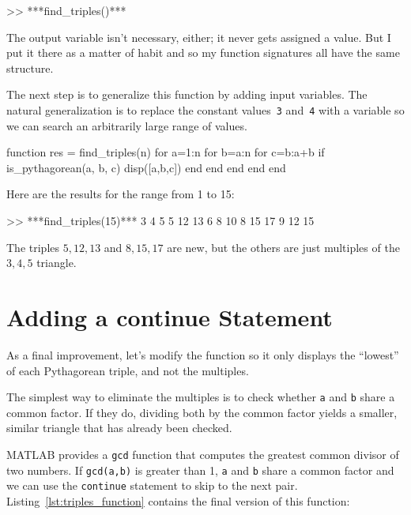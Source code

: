 \begin{code}
>> ***find_triples()***
\end{code}

The output variable isn't necessary, either; it
never gets assigned a value.  But I put it there as a matter of
habit and so my function signatures all have the same structure.


The next step is to generalize this function by adding input
variables.  The natural generalization is to replace the constant
values~\lstinline{3} and~\lstinline{4} with a variable so we can search an arbitrarily large
range of values.

\begin{code}
function res = find_triples(n)
    for a=1:n
        for b=a:n
            for c=b:a+b
                if is_pythagorean(a, b, c)
                    disp([a,b,c])
                end
            end
        end
    end
end
\end{code}

Here are the results for the range from 1 to 15:

\begin{code}
>> ***find_triples(15)***
     3     4     5
     5    12    13
     6     8    10
     8    15    17
     9    12    15
\end{code}

The triples $5,12,13$ and $8,15,17$ are new, but the others are just multiples of the $3,4,5$ triangle.

\section{Adding a continue Statement}


As a final improvement, let's modify the function so it only
displays the ``lowest'' of each Pythagorean triple, and not the
multiples.

The simplest way to eliminate the multiples is to check whether
\lstinline{a} and \lstinline{b} share a common factor.  If they do, dividing both
by the common factor yields a smaller, similar triangle that has
already been checked.


MATLAB provides a \lstinline{gcd} function that computes the greatest common
divisor of two numbers.  If \lstinline{gcd(a,b)} is greater than 1,
\lstinline{a} and \lstinline{b} share a common factor and we can use the \lstinline{continue}
statement to skip to the next pair. Listing~\ref{lst:triples_function} contains the final version of this function:

